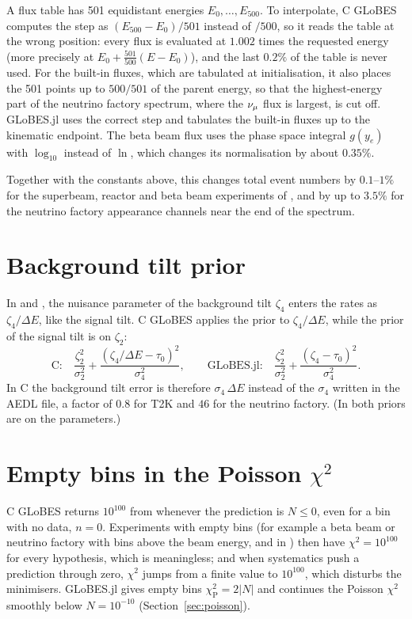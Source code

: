 A flux table has 501 equidistant energies $E_0,\dots,E_{500}$. To interpolate,
C GLoBES computes the step as $(E_{500}-E_0)/501$ instead of $/500$, so it
reads the table at the wrong position: every flux is evaluated at $1.002$
times the requested energy (more precisely at $E_0+\frac{501}{500}(E-E_0)$),
and the last $0.2\%$ of the table is never used. For the built-in fluxes, which
are tabulated at initialisation, it also places the 501 points up to $500/501$
of the parent energy, so that the highest-energy part of the neutrino factory
spectrum, where the $\nu_\mu$ flux is largest, is cut off. GLoBES.jl uses the
correct step and tabulates the built-in fluxes up to the kinematic endpoint.
The beta beam flux uses the phase space integral $g(y_e)$ with $\log_{10}$
instead of $\ln$, which changes its normalisation by about $0.35\%$.

Together with the constants above, this changes total event numbers by
$0.1$--$1\%$ for the superbeam, reactor and beta beam experiments of
, and by up to $3.5\%$ for the neutrino factory appearance
channels near the end of the spectrum.

\section{Background tilt prior}\label{sec:cdiff-tilt}

In  and , the nuisance parameter
of the background tilt $\zeta_4$ enters the rates as $\zeta_4/\Delta E$, like
the signal tilt. C GLoBES applies the prior to $\zeta_4/\Delta E$, while the
prior of the signal tilt is on $\zeta_2$:
\[
\text{C:}\quad \frac{\zeta_2^2}{\sigma_2^2} + \frac{(\zeta_4/\Delta E-\tau_0)^2}{\sigma_4^2},
\qquad
\text{GLoBES.jl:}\quad \frac{\zeta_2^2}{\sigma_2^2} + \frac{(\zeta_4-\tau_0)^2}{\sigma_4^2}.
\]
In C the background tilt error is therefore $\sigma_4\,\Delta E$ instead of the
$\sigma_4$ written in the AEDL file, a factor of $0.8$ for T2K and $46$ for the
neutrino factory. (In  both priors are on the
parameters.)

\section{Empty bins in the Poisson \texorpdfstring{$\chi^2$}{chi2}}\label{sec:cdiff-poisson}

C GLoBES returns $10^{100}$ from  whenever the prediction
is $N\le0$, even for a bin with no data, $n=0$. Experiments with empty bins
(for example a beta beam or neutrino factory with bins above the beam energy,
 and  in ) then have
$\chi^2=10^{100}$ for every hypothesis, which is meaningless; and when
systematics push a prediction through zero, $\chi^2$ jumps from a finite value
to $10^{100}$, which disturbs the minimisers. GLoBES.jl gives empty bins
$\chi^2_\text{P}=2|N|$ and continues the Poisson $\chi^2$ smoothly below
$N=10^{-10}$ (Section~\ref{sec:poisson}).

